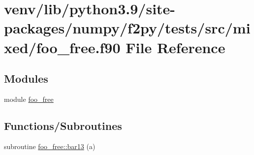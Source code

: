 \hypertarget{mixed_2foo__free_8f90}{}\section{venv/lib/python3.9/site-\/packages/numpy/f2py/tests/src/mixed/foo\+\_\+free.f90 File Reference}
\label{mixed_2foo__free_8f90}
\subsection*{Modules}
\begin{DoxyCompactItemize}
\item 
module \hyperlink{namespacefoo__free}{foo\+\_\+free}
\end{DoxyCompactItemize}
\subsection*{Functions/\+Subroutines}
\begin{DoxyCompactItemize}
\item 
subroutine \hyperlink{namespacefoo__free_a896f43467e09f09908fe94adde2e80e8}{foo\+\_\+free\+::bar13} (a)
\end{DoxyCompactItemize}
